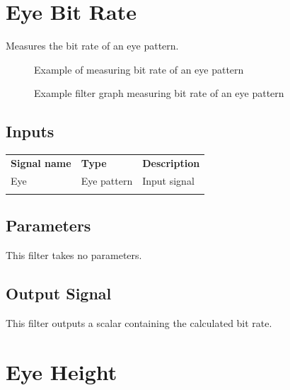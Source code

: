 \pagebreak
\section{Eye Bit Rate}
\label{filter:eyebitrate}

Measures the bit rate of an eye pattern.

\begin{figure}[h]
\centering
{}
\caption{Example of measuring bit rate of an eye pattern}
\label{filter_eye_bitrate}
\end{figure}

\begin{figure}[h]
\centering
{}
\caption{Example filter graph measuring bit rate of an eye pattern}
\label{filter_graph_eye_bitrate}
\end{figure}
\FloatBarrier

\subsection{Inputs}

\begin{tabularx}{16cm}{llX}
\thickhline
\textbf{Signal name} & \textbf{Type} & \textbf{Description} \\
\thickhline
Eye & Eye pattern & Input signal\\
\thickhline
\end{tabularx}

\subsection{Parameters}

This filter takes no parameters.

\subsection{Output Signal}

This filter outputs a scalar containing the calculated bit rate.

\pagebreak
\section{Eye Height}
\label{filter:eyeheight}


